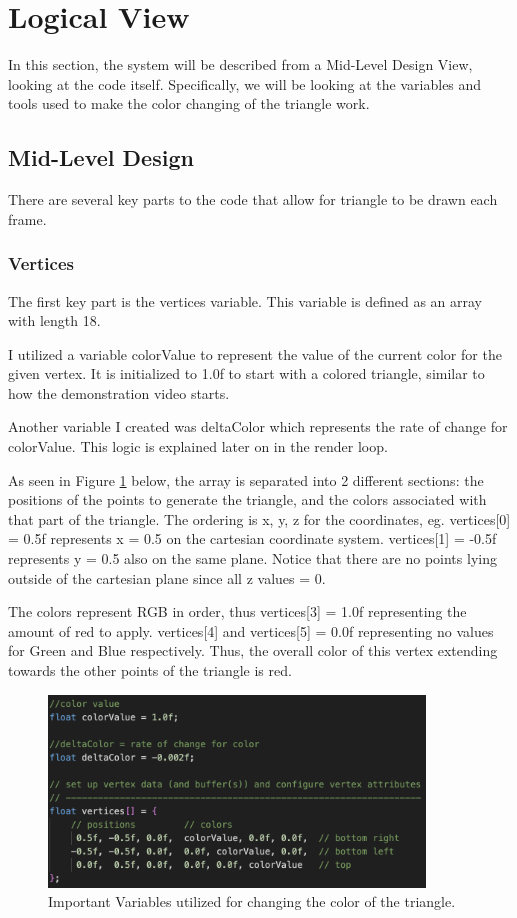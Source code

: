 \section{Logical View}
\label{section:logView}

In this section, the system will be described from a Mid-Level Design View, looking at the code itself.
Specifically, we will be looking at the variables and tools used to make the color changing of the triangle work.

\subsection{Mid-Level Design}

There are several key parts to the code that allow for triangle to be drawn each frame.

\subsubsection{Vertices}
The first key part is the vertices variable.
This variable is defined as an array with length 18.

I utilized a variable colorValue to represent the value of the current color for the given vertex.
It is initialized to 1.0f to start with a colored triangle, similar to how the demonstration video starts.

Another variable I created was deltaColor which represents the rate of change for colorValue.
This logic is explained later on in the render loop.

As seen in Figure \ref{Fig:vertices} below, the array is separated into 2 different sections: the positions of the points to generate the triangle, and the colors associated with that part of the triangle.
The ordering is x, y, z for the coordinates, eg. vertices[0] = 0.5f represents x = 0.5 on the cartesian coordinate system.
vertices[1] = -0.5f represents y = 0.5 also on the same plane.
Notice that there are no points lying outside of the cartesian plane since all z values = 0.

The colors represent RGB in order, thus vertices[3] = 1.0f representing the amount of red to apply.
vertices[4] and vertices[5] = 0.0f representing no values for Green and Blue respectively. 
Thus, the overall color of this vertex extending towards the other points of the triangle is red.

\begin{figure}[htb]
    \centering
    \includegraphics[width=10cm]{./Images/Vertices.png}
       \caption{Important Variables utilized for changing the color of the triangle.}
           \label{Fig:vertices}
\end{figure}

